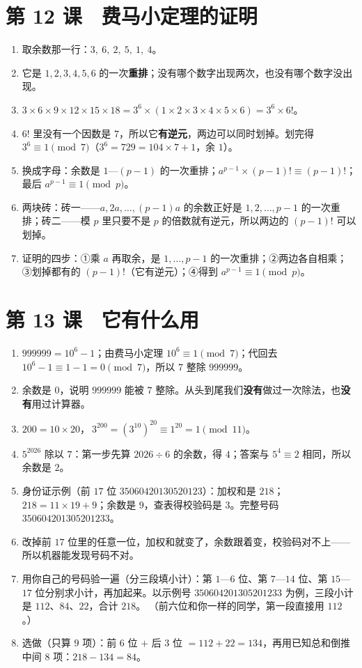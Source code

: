 \section*{第 12 课　费马小定理的证明}
\begin{enumerate}
  \item 取余数那一行：\(3,\ 6,\ 2,\ 5,\ 1,\ 4\)。
  \item 它是 \(1,2,3,4,5,6\) 的一次\textbf{重排}；没有哪个数字出现两次，也没有哪个数字没出现。
  \item \(3\times6\times9\times12\times15\times18=3^6\times(1\times2\times3\times4\times5\times6)=3^6\times6!\)。
  \item \(6!\) 里没有一个因数是 \(7\)，所以它\textbf{有逆元}，两边可以同时划掉。划完得 \(3^6\equiv1\pmod7\)（\(3^6=729=104\times7+1\)，余 \(1\)）。
  \item 换成字母：余数是 \(1\text{—}(p-1)\) 的一次重排；\(a^{p-1}\times(p-1)!\equiv(p-1)!\)；最后 \(a^{p-1}\equiv1\pmod p\)。
  \item 两块砖：砖一——\(a,2a,\dots,(p-1)a\) 的余数正好是 \(1,2,\dots,p-1\) 的一次重排；砖二——模 \(p\) 里只要不是 \(p\) 的倍数就有逆元，所以两边的 \((p-1)!\) 可以划掉。
  \item 证明的四步：①乘 \(a\) 再取余，是 \(1,\dots,p-1\) 的一次重排；②两边各自相乘；③划掉都有的 \((p-1)!\)（它有逆元）；④得到 \(a^{p-1}\equiv1\pmod p\)。
\end{enumerate}

\section*{第 13 课　它有什么用}
\begin{enumerate}
  \item \(999999=10^6-1\)；由费马小定理 \(10^6\equiv1\pmod7\)；代回去 \(10^6-1\equiv1-1=0\pmod7\)，所以 \(7\) 整除 \(999999\)。
  \item 余数是 \(0\)，说明 \(999999\) 能被 \(7\) 整除。从头到尾我们\textbf{没有}做过一次除法，也\textbf{没有}用过计算器。
  \item \(200=10\times20\)，\(\ 3^{200}=(3^{10})^{20}\equiv1^{20}=1\pmod{11}\)。
  \item \(5^{2026}\) 除以 \(7\)：第一步先算 \(2026\div6\) 的余数，得 \(4\)；答案与 \(5^4\equiv2\) 相同，所以余数是 \(2\)。
  \item 身份证示例（前 \(17\) 位 \(35060420130520123\)）：加权和是 \(218\)；\(218=11\times19+9\)；余数是 \(9\)，查表得校验码是 \(3\)。完整号码 \(350604201305201233\)。
  \item 改掉前 \(17\) 位里的任意一位，加权和就变了，余数跟着变，校验码对不上——所以机器能发现号码不对。
  \item 用你自己的号码验一遍（分三段填小计）：第 \(1\)—\(6\) 位、第 \(7\)—\(14\) 位、第 \(15\)—\(17\) 位分别求小计，再加起来。以示例号 \(350604201305201233\) 为例，三段小计是 \textbf{\(112\)}、\textbf{\(84\)}、\textbf{\(22\)}，合计 \(218\)。
    （前六位和你一样的同学，第一段直接用 \(112\)。）
  \item 选做（只算 \(9\) 项）：前 \(6\) 位 \(+\) 后 \(3\) 位 \(=112+22=134\)，再用已知总和倒推中间 \(8\) 项：\(218-134=\)\textbf{\(84\)}。
\end{enumerate}

